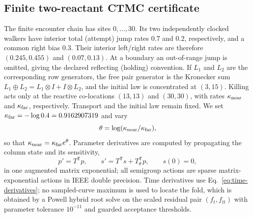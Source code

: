 \documentclass[aps,pre,reprint,amsmath,amssymb,longbibliography,floatfix]{revtex4-2}
\begin{document}
\subsection{Finite two-reactant CTMC certificate}
\label{sec:finite-ctmc}

The finite encounter chain has sites \(0,\ldots,30\). Its two independently
clocked walkers have interior total (attempt) jump rates \(0.7\) and \(0.2\),
respectively, and a common right bias \(0.3\). Their interior left/right rates
are therefore
\((0.245,0.455)\) and \((0.07,0.13)\). At a boundary an out-of-range jump is
omitted, giving the declared reflecting (holding) convention. If \(L_1\) and
\(L_2\) are the corresponding row generators, the free pair generator is the
Kronecker sum \(L_1\oplus L_2=L_1\otimes I+I\otimes L_2\), and the initial law
is concentrated at \((3,15)\). Killing acts only at the reactive co-locations
\((13,13)\) and \((30,30)\), with rates \(\kappa_{\rm near}\) and
\(\kappa_{\rm far}\), respectively. Transport and the initial law remain
fixed. We set \(\kappa_{\rm far}=-\log 0.4=0.9162907319\) and vary
\begin{equation}
\theta=\log(\kappa_{\rm near}/\kappa_{\rm far}),
\label{eq:ctmc-control}
\end{equation}
so that \(\kappa_{\rm near}=\kappa_{\rm far}e^\theta\). Parameter derivatives
are computed by propagating the column state and its sensitivity,
\begin{equation}
p'=T^\mathsf Tp,\qquad
s'=T^\mathsf Ts+T_\theta^\mathsf Tp,\qquad s(0)=0,
\label{eq:augmented-sensitivity}
\end{equation}
in one augmented matrix exponential; all semigroup actions are sparse
matrix-exponential actions in IEEE double precision. Time derivatives use
Eq.~\eqref{eq:time-derivatives}; no sampled-curve maximum is used to locate
the fold, which is obtained by a Powell hybrid root solve on the scaled
residual pair \((f_t,f_{tt})\) with parameter tolerance \(10^{-11}\) and
guarded acceptance thresholds.
\end{document}

